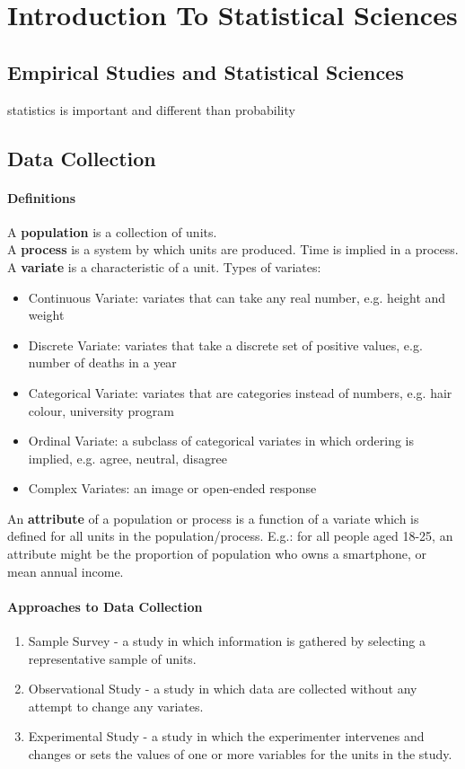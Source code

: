 \documentclass[10pt,letter]{article}
\theoremstyle{plain}
\theoremstyle{definition}
\begin{document}
\section{Introduction To Statistical Sciences}
\subsection{Empirical Studies and Statistical Sciences}
statistics is important and different than probability

\subsection{Data Collection}
\paragraph{Definitions}
A \textbf{population} is a collection of units. \\ 
A \textbf{process} is a system by which units are produced. Time is implied in a process. \\ 
A \textbf{variate} is a characteristic of a unit. Types of variates: 
\begin{itemize}
    \item Continuous Variate: variates that can take any real number, e.g. height and weight
    \item Discrete Variate: variates that take a discrete set of positive values, e.g. number of deaths in a year 
    \item Categorical Variate: variates that are categories instead of numbers, e.g. hair colour, university program 
    \item Ordinal Variate: a subclass of categorical variates in which ordering is implied, e.g. agree, neutral, disagree
    \item Complex Variates: an image or open-ended response
\end{itemize}
An \textbf{attribute} of a population or process is a function of a variate which is defined for all units in the population/process. E.g.: for all people aged 18-25, an attribute might be the proportion of population who owns a smartphone, or mean annual income.\\ 

\paragraph{Approaches to Data Collection}
\begin{enumerate}
    \item Sample Survey - a study in which information is gathered by selecting a representative sample of units. 
    \item Observational Study - a study in which data are collected without any attempt to change any variates.
    \item Experimental Study - a study in which the experimenter intervenes and changes or sets the values of one or more variables for the units in the study.
\end{enumerate}
\end{document}
